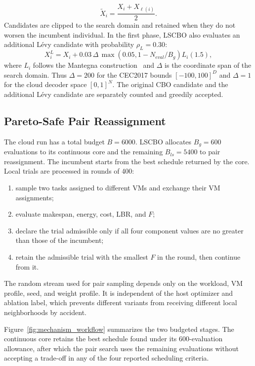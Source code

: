 \documentclass[pdflatex,onecolumn,sn-mathphys-num]{sn-jnl}
\begin{document}
\begin{equation}
\widetilde{X}_i=\frac{X_i+X_{\ell(i)}}{2}.
\end{equation}
Candidates are clipped to the search domain and retained when they do not worsen the incumbent individual. In the first phase, LSCBO also evaluates an additional L\'{e}vy candidate with probability $\rho_L=0.30$:
\begin{equation}
X_i^L=X_i+0.03\,\Delta\,\max(0.05,1-N_{eval}/B_g)L_i(1.5),
\end{equation}
where $L_i$ follows the Mantegna construction~\cite{Mantegna1994} and $\Delta$ is the coordinate span of the search domain. Thus $\Delta=200$ for the CEC2017 bounds $[-100,100]^D$ and $\Delta=1$ for the cloud decoder space $[0,1]^N$. The original CBO candidate and the additional L\'{e}vy candidate are separately counted and greedily accepted.

\subsection{Pareto-Safe Pair Reassignment}\label{sec:local_search}
The cloud run has a total budget $B=6000$. LSCBO allocates $B_g=600$ evaluations to its continuous core and the remaining $B_{ls}=5400$ to pair reassignment. The incumbent starts from the best schedule returned by the core. Local trials are processed in rounds of 400:
\begin{enumerate}
    \item sample two tasks assigned to different VMs and exchange their VM assignments;
    \item evaluate makespan, energy, cost, LBR, and $F$;
    \item declare the trial admissible only if all four component values are no greater than those of the incumbent;
    \item retain the admissible trial with the smallest $F$ in the round, then continue from it.
\end{enumerate}
The random stream used for pair sampling depends only on the workload, VM profile, seed, and weight profile. It is independent of the host optimizer and ablation label, which prevents different variants from receiving different local neighborhoods by accident.

Figure~\ref{fig:mechanism_workflow} summarizes the two budgeted stages. The continuous core retains the best schedule found under its 600-evaluation allowance, after which the pair search uses the remaining evaluations without accepting a trade-off in any of the four reported scheduling criteria.
\end{document}
